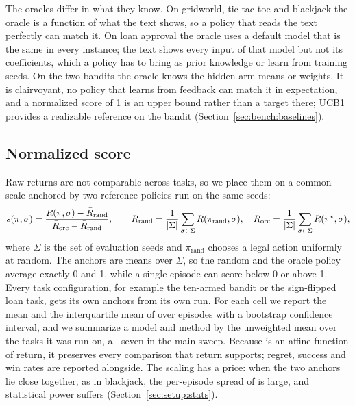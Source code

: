 The oracles differ in what they know. On gridworld, tic-tac-toe and blackjack the oracle is a function of what the text shows, so a policy that reads the text perfectly can match it. On loan approval the oracle uses a default model that is the same in every instance; the text shows every input of that model but not its coefficients, which a policy has to bring as prior knowledge or learn from training seeds. On the two bandits the oracle knows the hidden arm means or weights. It is clairvoyant, no policy that learns from feedback can match it in expectation, and a normalized score of 1 is an upper bound rather than a target there; UCB1 provides a realizable reference on the bandit (Section~\ref{sec:bench:baselines}).

\subsection{Normalized score}
\label{sec:bench:score}

Raw returns are not comparable across tasks, so we place them on a common scale anchored by two reference policies run on the same seeds:
\begin{equation}
\label{eq:norm}
s(\pi,\sigma) = \frac{R(\pi,\sigma) - \bar R_{\mathrm{rand}}}{\bar R_{\mathrm{orc}} - \bar R_{\mathrm{rand}}},
\qquad
\bar R_{\mathrm{rand}} = \frac{1}{|\Sigma|}\sum_{\sigma\in\Sigma} R(\pi_{\mathrm{rand}},\sigma),
\quad
\bar R_{\mathrm{orc}} = \frac{1}{|\Sigma|}\sum_{\sigma\in\Sigma} R(\pi^\star,\sigma),
\end{equation}
where $\Sigma$ is the set of evaluation seeds and $\pi_{\mathrm{rand}}$ chooses a legal action uniformly at random. The anchors are means over $\Sigma$, so the random and the oracle policy average exactly 0 and 1, while a single episode can score below 0 or above 1. Every task configuration, for example the ten-armed bandit or the sign-flipped loan task, gets its own anchors from its own run. For each cell we report the mean and the interquartile mean of \norm{} over episodes with a bootstrap confidence interval, and we summarize a model and method by the unweighted mean over the tasks it was run on, all seven in the main sweep. Because \norm{} is an affine function of return, it preserves every comparison that return supports; regret, success and win rates are reported alongside. The scaling has a price: when the two anchors lie close together, as in blackjack, the per-episode spread of \norm{} is large, and statistical power suffers (Section~\ref{sec:setup:stats}).

